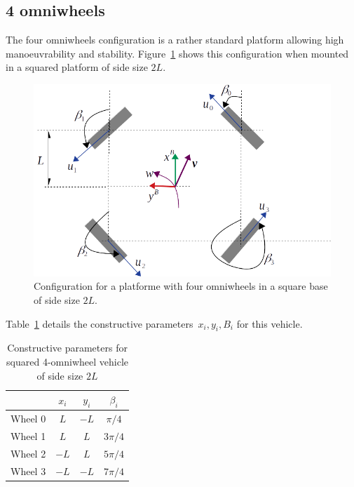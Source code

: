 \subsection{4 omniwheels}
The four omniwheels configuration is a rather standard platform allowing high manoeuvrability and stability. Figure~\ref{fig:four_omniwheels_kinematics} shows this configuration when mounted in a squared platform of side size $2L$.
\begin{figure}[bth!]
  \begin{center}
    \includegraphics[width=1.0\columnwidth]{figures/four_omniwheels_kinematics.png}
    \caption{Configuration for a platforme with four omniwheels in a square base of side size $2L$.}
    \label{fig:four_omniwheels_kinematics}
  \end{center}
\end{figure}

Table~\ref{tab:params_4_omni} details the constructive parameters~$x_i,y_i,B_i$ for this vehicle. 
\begin{table}[hbt] \centering
\caption{Constructive parameters for squared 4-omniwheel vehicle of side size $2L$}
\begin{tabular}
[c]{|c|c|c|c|}\hline
		& $x_i$ 		& $y_i$				& $\beta_i$ \\\hline
Wheel 0 & $L$ 		    & $-L$				& $\pi/4$ \\\hline
Wheel 1 & $L$ 		    & $L$				& $3\pi/4$ \\\hline
Wheel 2 & $-L$ 		    & $L$				& $5\pi/4$ \\\hline
Wheel 3 & $-L$ 		    & $-L$				& $7\pi/4$ \\\hline
\end{tabular}
\label{tab:params_4_omni}
\end{table}

